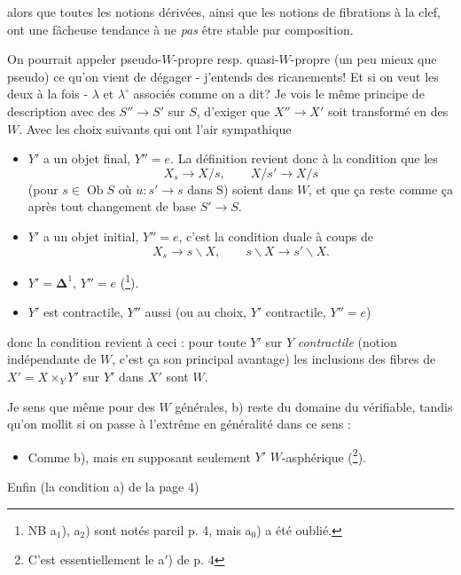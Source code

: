 \documentclass[11pt,leqno]{article}
\newcommand{\printedpage}[1]{\marginpar{\footnotesize p.~#1}}
\newcommand{\msp}[1]{\marginpar{\footnotesize [#1]}}
\newcommand{\fl}{\longrightarrow}
\newcommand{\Ob}{\operatorname{Ob}}
\begin{document}
\printedpage{29}
alors que toutes les notions dérivées, ainsi que les notions de fibrations à la clef, ont une fâcheuse tendance à ne \textit{pas} être stable par composition.

On pourrait appeler pseudo-$W$-propre resp. quasi-$W$-propre (un peu mieux que pseudo) ce qu'on vient de dégager - j'entends des ricanements! Et si on veut les deux à la fois - $\lambda$ et $\lambda^{\circ}$ associés comme on a dit? Je vois le même principe de description avec des $S''\fl S'$ sur $S$, d'exiger que $X''\fl X'$ soit transformé en des $W$. Avec les choix suivants qui ont l'air sympathique

\begin{itemize}
\item[a$_1$)] \msp{page 39}$Y'$ a un objet final, $Y''=e$. La définition revient donc à la condition que les
\[ X_s\fl X/s, \qquad X/s'\fl X/s \]
(pour $s\in\Ob S$ où $u : s'\fl s$ dans $\mathrm{S}$) soient dans $W$, et que ça reste comme ça après tout changement de base $S'\fl S$.

\item[a$_2$)] $Y'$ a un objet initial, $Y''=e$, c'est la condition duale à coups de
\[ X_s\fl s\backslash X, \qquad s\backslash X\fl s'\backslash X. \]

\item[a$_0$)] $Y'=\boldsymbol{\Delta}^1$, $Y''=e$ (\footnote[46]{NB a$_1$), a$_2$) sont notés pareil p. 4, mais a$_0$) a été oublié.}).

\item[b)] $Y'$ est contractile, $Y''$ aussi (ou au choix, $Y'$ contractile, $Y''=e$)
\end{itemize}

donc la condition revient à ceci : pour toute $Y'$ sur $Y$ \textit{contractile} (notion indépendante de $W$, c'est ça son principal avantage) les inclusions des fibres de $X'=X\times_Y Y'$ sur $Y'$ dans $X'$ sont $W$.

Je sens que même pour des $W$ générales, b) reste du domaine du vérifiable, tandis qu'on mollit si on passe à l'extrême en généralité dans ce sens :

\begin{itemize}
\item[b$'$)] Comme b), mais en supposant seulement $Y'$ $W$-asphérique (\footnote[47]{C'est essentiellement le a$'$) de p. 4}).
\end{itemize}

Enfin (la condition a) de la page 4)
\end{document}

